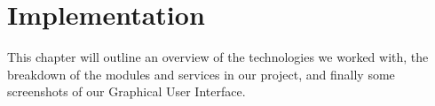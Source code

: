 \chapter{\centering Implementation}

This chapter will outline an overview of the technologies we worked with, the breakdown 
of the modules and services in our project, and finally some screenshots of our Graphical 
User Interface.





